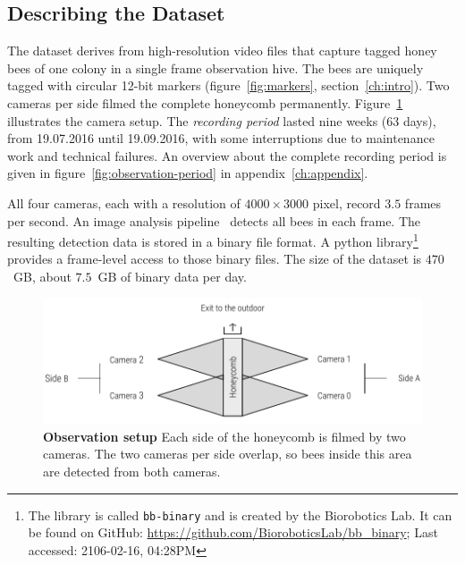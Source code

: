 \subsection{Describing the Dataset}
\label{sec:dataset}
The dataset derives from high-resolution video files that capture tagged honey bees of one colony in a single frame observation hive.
The bees are uniquely tagged with circular 12-bit markers (figure~\ref{fig:markers}, section~\ref{ch:intro}).
Two cameras per side filmed the complete honeycomb permanently.
Figure~\ref{fig:obssetup} illustrates the camera setup.
The \emph{recording period} lasted nine weeks (63 days), from 19.07.2016 until 19.09.2016, with some interruptions due to maintenance work and technical failures. An overview about the complete recording period is given in figure~\ref{fig:observation-period} in appendix~\ref{ch:appendix}.

All four cameras, each with a resolution of $4000\times3000$ pixel, record $3.5$ frames per second. 
An image analysis pipeline~\cite{wario2015automatic} detects all bees in each frame.
The resulting detection data is stored in a binary file format.
A python library\footnote{The library is called \texttt{bb-binary} and is created by the Biorobotics Lab. It can be found on GitHub: \url{https://github.com/BioroboticsLab/bb_binary}; Last accessed: 2106-02-16, 04:28PM} provides a frame-level access to those binary files.
The size of the dataset is $470$~GB, about $7.5$~GB of binary data per day.

\begin{figure}
	\centering
	\includegraphics[width=1.0\textwidth]{Figures/setupCams}
 	\caption[Observation setup]{\textbf{Observation setup} Each side of the honeycomb is filmed by two cameras. The two cameras per side overlap, so bees inside this area are detected from both cameras.}
 	\label{fig:obssetup}
\end{figure}

